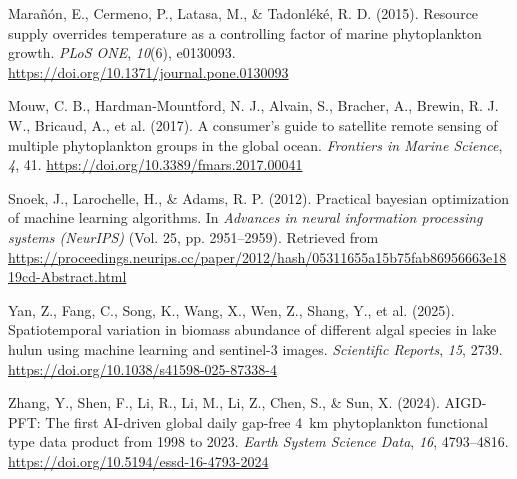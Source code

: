 \documentclass[
]{agujournal2019}
\newlength{\cslhangindent}
\newenvironment{CSLReferences}[2] %
 {\begin{list}{}{%
  \setlength{\itemindent}{0pt}
  \setlength{\leftmargin}{0pt}
  \setlength{\parsep}{0pt}
  \ifodd #1
   \setlength{\leftmargin}{\cslhangindent}
   \setlength{\itemindent}{-1\cslhangindent}
  \fi
  \setlength{\itemsep}{#2\baselineskip}}}
 {\end{list}}
\begin{document}
\begin{CSLReferences}{1}{0}
Marañón, E., Cermeno, P., Latasa, M., \& Tadonléké, R. D. (2015).
Resource supply overrides temperature as a controlling factor of marine
phytoplankton growth. \emph{PLoS ONE}, \emph{10}(6), e0130093.
\url{https://doi.org/10.1371/journal.pone.0130093}

Mouw, C. B., Hardman-Mountford, N. J., Alvain, S., Bracher, A., Brewin,
R. J. W., Bricaud, A., et al. (2017). A consumer's guide to satellite
remote sensing of multiple phytoplankton groups in the global ocean.
\emph{Frontiers in Marine Science}, \emph{4}, 41.
\url{https://doi.org/10.3389/fmars.2017.00041}

Snoek, J., Larochelle, H., \& Adams, R. P. (2012). Practical bayesian
optimization of machine learning algorithms. In \emph{Advances in neural
information processing systems (NeurIPS)} (Vol. 25, pp. 2951--2959).
Retrieved from
\url{https://proceedings.neurips.cc/paper/2012/hash/05311655a15b75fab86956663e1819cd-Abstract.html}

Yan, Z., Fang, C., Song, K., Wang, X., Wen, Z., Shang, Y., et al.
(2025). Spatiotemporal variation in biomass abundance of different algal
species in lake hulun using machine learning and sentinel-3 images.
\emph{Scientific Reports}, \emph{15}, 2739.
\url{https://doi.org/10.1038/s41598-025-87338-4}

Zhang, Y., Shen, F., Li, R., Li, M., Li, Z., Chen, S., \& Sun, X.
(2024). {AIGD-PFT}: The first AI-driven global daily gap-free 4~km
phytoplankton functional type data product from 1998 to 2023.
\emph{Earth System Science Data}, \emph{16}, 4793--4816.
\url{https://doi.org/10.5194/essd-16-4793-2024}

\end{CSLReferences}
\end{document}
